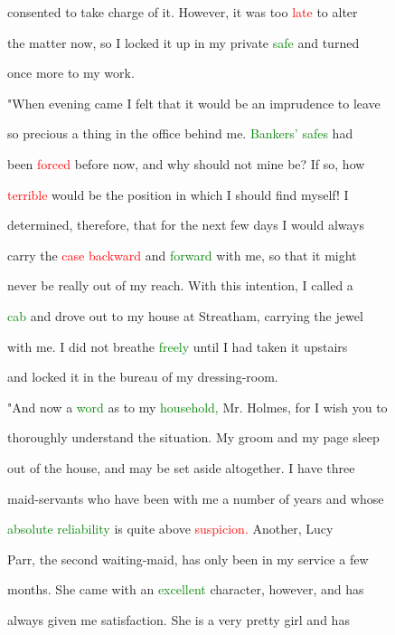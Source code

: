  consented to take charge of it. However, it was too \textcolor{red}{late} to alter

 the matter now, so I locked it up in my private \textcolor{green}{safe} and turned

 once more to my work.



 "When evening came I felt that it would be an imprudence to \textcolor{BurntOrange}{leave}

 so \textcolor{BurntOrange}{precious} a thing in the office behind me. \textcolor{green}{Bankers'} \textcolor{green}{safes} had

 been \textcolor{red}{forced} before now, and why should not mine be? If so, how

 \textcolor{red}{terrible} would be the position in which I should find myself! I

 determined, therefore, that for the next few days I would always

 carry the \textcolor{red}{case} \textcolor{red}{backward} and \textcolor{green}{forward} with me, so that it might

 never be really out of my reach. With this intention, I called a

 \textcolor{green}{cab} and drove out to my house at Streatham, carrying the jewel

 with me. I did not breathe \textcolor{green}{freely} until I had taken it upstairs

 and locked it in the bureau of my dressing-room.



 "And now a \textcolor{green}{word} as to my \textcolor{green}{household,} Mr. Holmes, for I wish you to

 thoroughly understand the situation. My groom and my page sleep

 out of the house, and may be set aside altogether. I have three

 maid-servants who have been with me a number of years and whose

 \textcolor{green}{absolute} \textcolor{green}{reliability} is quite above \textcolor{red}{suspicion.} Another, Lucy

 Parr, the second waiting-maid, has only been in my service a few

 months. She came with an \textcolor{green}{excellent} character, however, and has

 always given me satisfaction. She is a very \textcolor{BurntOrange}{pretty} girl and has

